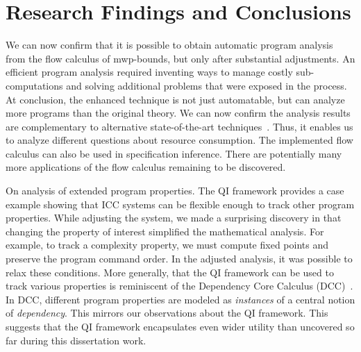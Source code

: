 \section{Research Findings and Conclusions}
\label{sec:aicc-discussion}

We can now confirm that it is possible to obtain automatic program analysis from
the flow calculus of mwp-bounds, but only after substantial adjustments. An
efficient program analysis required inventing ways to manage costly
sub-computations and solving additional problems that were exposed in the
process. At conclusion, the enhanced technique is not just automatable, but can
analyze more programs than the original theory. We can now confirm the analysis
results are complementary to alternative state-of-the-art techniques~\cite[p.
5]{aubert2023b}. Thus, it enables us to analyze different questions about
resource consumption. The implemented flow calculus can also be used in
specification inference. There are potentially many more applications of the
flow calculus remaining to be discovered.

{On analysis of extended program properties.} The QI framework provides a case
example showing that ICC systems can be flexible enough to track other program
properties. While adjusting the system, we made a surprising discovery in that
changing the property of interest simplified the mathematical analysis. For
example, to track a complexity property, we must compute fixed points and
preserve the program command order. In the adjusted analysis, it was possible to
relax these conditions. More generally, that the QI framework can be used to
track various properties is reminiscent of the Dependency Core Calculus
(DCC)~\cite{abadi1999b}. In DCC, different program properties are modeled as
\emph{instances} of a central notion of \emph{dependency}. This mirrors our
observations about the QI framework. This suggests that the QI framework
encapsulates even wider utility than uncovered so far during this dissertation
work.


